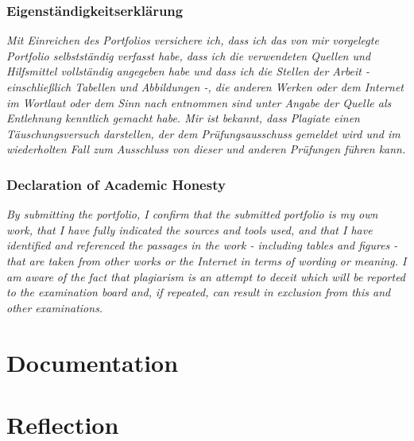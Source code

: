 \documentclass[]{tukportfolio}
\author{Your Name}
\begin{document}

\maketitle

\section*{Eigenständigkeitserklärung}
\textit{Mit Einreichen des Portfolios versichere ich, dass ich das von mir vorgelegte Portfolio selbstständig verfasst habe, dass ich die verwendeten Quellen und Hilfsmittel vollständig angegeben habe und dass ich die Stellen der Arbeit - einschließlich Tabellen und Abbildungen -, die anderen Werken oder dem Internet im Wortlaut oder dem Sinn nach entnommen sind unter Angabe der Quelle als Entlehnung kenntlich gemacht habe.
Mir ist bekannt, dass Plagiate einen Täuschungsversuch darstellen, der dem Prüfungsausschuss gemeldet wird und im wiederholten Fall zum Ausschluss von dieser und anderen Prüfungen führen kann.} \\

\section*{Declaration of Academic Honesty}
\textit{By submitting the portfolio, I confirm that the submitted portfolio is my own work, that I have fully indicated the sources and tools used, and that I have identified and referenced the passages in the work - including tables and figures - that are taken from other works or the Internet in terms of wording or meaning.
I am aware of the fact that plagiarism is an attempt to deceit which will be reported to the examination board and, if repeated, can result in exclusion from this and other examinations.}

\newpage

\part*{Documentation}


\newpage

\part*{Reflection}


\newpage
\nocite{*}


\end{document}
